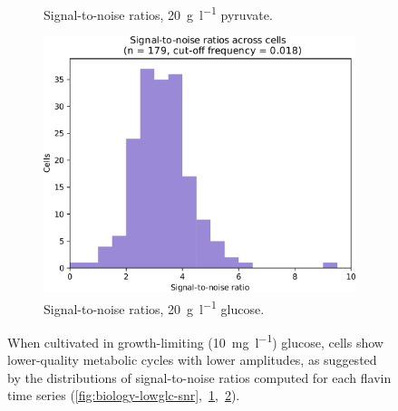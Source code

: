 \begin{figure}
\begin{subfigure}[t]{0.3\textwidth}
   \caption{
     Signal-to-noise ratios, \SI{20}{\gram~\litre^{-1}} pyruvate.
   }
   \label{fig:biology-pyruvate-snr}
  \end{subfigure}%
  \begin{subfigure}[t]{0.3\textwidth}
   \centering
   \includegraphics[width=\textwidth]{glucose_snr_edit.pdf}
   \caption{
     Signal-to-noise ratios, \SI{20}{\gram~\litre^{-1}} glucose.
   }
   \label{fig:biology-highglc-snr}
  \end{subfigure}

  \caption{
    When cultivated in growth-limiting (\SI{10}{\milli\gram~\litre^{-1}}) glucose, cells show lower-quality metabolic cycles with lower amplitudes, as suggested by the distributions of signal-to-noise ratios computed for each flavin time series (\ref{fig:biology-lowglc-snr},~\ref{fig:biology-pyruvate-snr},~\ref{fig:biology-highglc-snr}).
  }
  \label{fig:biology-lowglc}
\end{figure}


